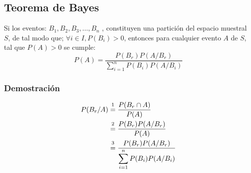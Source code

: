 \subsection{Teorema de Bayes}
Si los eventos: $B_1,B_2,B_3,\ldots,B_n$ , constituyen una partición del espacio muestral $S$, de tal modo que; $\forall i\in I,P(B_i)>0$, entonces para cualquier evento $A$ de $S$, tal que $P(A)>0$ se cumple:
$$P(A)=\dfrac{P(B_r)P(A/B_r)}{\displaystyle\sum_{i=1}^{n} P(B_i)P(A/B_i)}$$
\subsubsection{Demostración}
\begin{align*}
P(B_r/A) &\varstackrel{1}{=} \dfrac{P(B_r\cap A)}{P(A)} \\
&\varstackrel{2}{=} \dfrac{P(B_r)P(A/B_r)}{P(A)}  \\
&\varstackrel{3}{=} \dfrac{P(B_r)P(A/B_r)}{\displaystyle\sum_{i=1}^{n} P(B_i)P(A/B_i)}
\end{align*}
